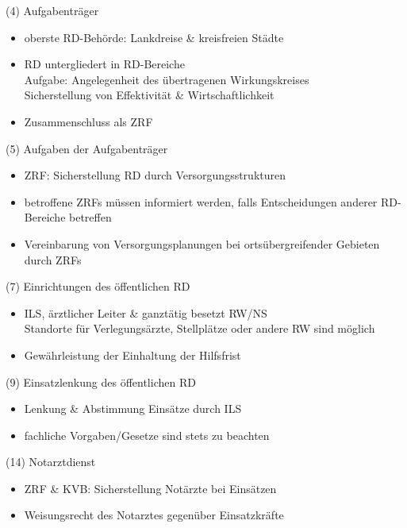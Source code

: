 \begin{sectionbox}{(4) Aufgabenträger}
    \begin{itemize}
        \item oberste RD-Behörde: Lankdreise \& kreisfreien Städte
        \item RD untergliedert in RD-Bereiche\\
        \ra Aufgabe: Angelegenheit des übertragenen Wirkungskreises\\
        \ra Sicherstellung von Effektivität \& Wirtschaftlichkeit
        \item Zusammenschluss als ZRF
    \end{itemize}
\end{sectionbox}
\begin{sectionbox}{(5) Aufgaben der Aufgabenträger}
    \begin{itemize}
        \item ZRF: Sicherstellung RD durch Versorgungsstrukturen
        \item betroffene ZRFs müssen informiert werden, falls Entscheidungen anderer RD-Bereiche betreffen
        \item Vereinbarung von Versorgungsplanungen bei ortsübergreifender Gebieten durch ZRFs
    \end{itemize}
\end{sectionbox}
\begin{sectionbox}{(7) Einrichtungen des öffentlichen RD}
    \begin{itemize}
        \item ILS, ärztlicher Leiter \& ganztätig besetzt RW/NS\\
        \ra Standorte für Verlegungsärzte, Stellplätze oder andere RW sind möglich
        \item Gewährleistung der Einhaltung der Hilfsfrist
    \end{itemize}
\end{sectionbox}
\begin{sectionbox}{(9) Einsatzlenkung des öffentlichen RD}
    \begin{itemize}
        \item Lenkung \& Abstimmung Einsätze durch ILS
        \item fachliche Vorgaben/Gesetze sind stets zu beachten
    \end{itemize}
\end{sectionbox}
\begin{sectionbox}{(14) Notarztdienst}
    \begin{itemize}
        \item ZRF \& KVB: Sicherstellung Notärzte bei Einsätzen
        \item Weisungsrecht des Notarztes gegenüber Einsatzkräfte 
    \end{itemize}
\end{sectionbox}
